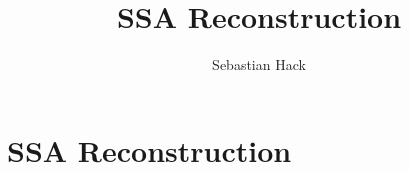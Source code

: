 
% 
% 
% 


\newcommand{\var}[1]{\mathtt{#1}}
\newcommand{\phiop}{$\phi$-function}
\newcommand{\phiops}{\phiop s}
\newcommand{\phizero}{\ensuremath{\phi_0}}


\title{SSA Reconstruction}
\author{Sebastian Hack}

\chapter{SSA Reconstruction }

